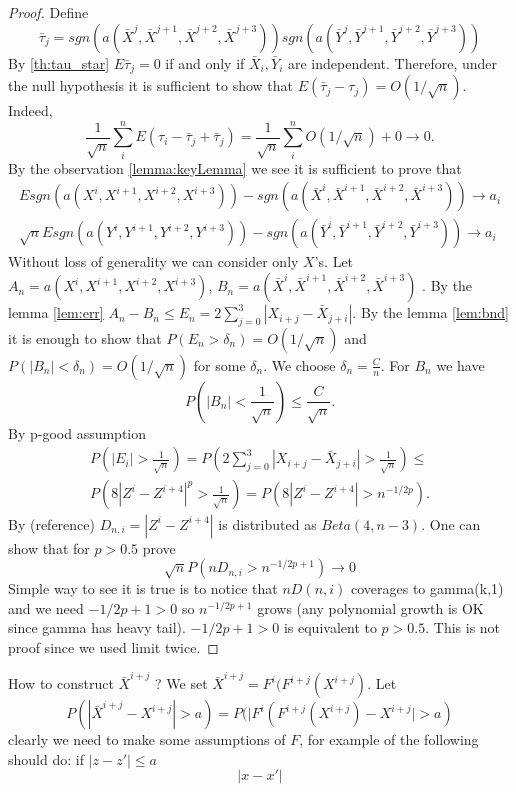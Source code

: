 \documentclass{article}
\begin{document}
\begin{proof}
Define 
\[
 \bar \tau_j = sgn(a(\bar X^{j},\bar X^{j+1},\bar X^{j+2}, \bar X^{j+3})) sgn(a(\bar Y^{j},\bar Y^{j+1},\bar Y^{j+2},\bar Y^{j+3}))
\]
By \ref{th:tau_star} $E \bar \tau_j=0$ if and only if  $\bar X_i , \bar Y_i$ are independent. Therefore, under the null hypothesis it is sufficient to show  that $ E (\bar \tau_j - \tau_j) = O(1/ \sqrt n)$. Indeed, 
\[
 \frac{1} {\sqrt n} \sum_{i}^{n} E (\tau_i - \bar \tau_j +\bar \tau_j) = \frac{1} {\sqrt n} \sum_{i}^{n} O(1/ \sqrt n) +0 \to 0.
\]
By the observation \ref{lemma:keyLemma} we see it is sufficient to prove that  
\begin{align}
   E sgn(a(X^{i},X^{i+1},X^{i+2},X^{i+3})) - sgn(a(\bar X^{i},\bar X^{i+1},\bar X^{i+2}, \bar X^{i+3})) \to a_i  \\
  \sqrt n  E sgn(a(Y^{i},Y^{i+1},Y^{i+2},Y^{i+3})) - sgn(a(\bar Y^{i},\bar Y^{i+1},\bar Y^{i+2}, \bar Y^{i+3})) \to a_i
\end{align}
Without loss of generality we can consider only $X$'s. Let $A_n = a(X^{i},X^{i+1},X^{i+2},X^{i+3})$, $B_n = a(\bar X^{i},\bar X^{i+1},\bar X^{i+2}, \bar X^{i+3})$ . By the lemma \ref{lem:err} $ A_n-B_n \leq E_n = 2 \sum_{j=0}^3 |X_{i+j}-\bar X_{j+i}|$. By the lemma  \ref{lem:bnd} it is enough to show that  $P( E_n > \delta_n ) = O(1/ \sqrt n)$ and $P( |B_n| < \delta_n )=O(1/ \sqrt n)$ for some  $\delta_n$. We choose $\delta_n = \frac{C} {n}$. For $B_n$ we have 
\[
 P( |B_n| < \frac{1}{\sqrt n} ) \leq \frac{C}{\sqrt n}. 
\]
By p-good assumption
\begin{align}
 P(|E_i| > \frac{1}{\sqrt n} ) = P( 2 \sum_{j=0}^3 |X_{i+j}-\bar X_{j+i}| > \frac{1}{\sqrt n} ) \leq \\
 P( 8|Z^i - Z^{i+4}|^p > \frac{1}{\sqrt n} )   =  P(  8|Z^i - Z^{i+4}| > n^{-1/2p} ).
\end{align}
By (reference)  $D_{n,i} = |Z^i - Z^{i+4}|$ is distributed as $Beta(4,n-3)$.  One can show that for $p>0.5$ prove
\[
 \sqrt n P( n D_{n,i} > n^{-1/2p+1}) \to 0 
\]
Simple way to see it is true is to  notice that $n D(n,i)$ coverages to gamma(k,1) and we need $-1/2p+1 >0 $ so $n^{-1/2p+1}$ grows (any polynomial growth is OK since gamma has heavy tail).  $-1/2p+1 >0$ is equivalent to $p>0.5$. This is not proof since we used limit twice.
\end{proof}

How to construct $\bar X^{i+j}$ ? We set $\bar X^{i+j} =  F^i(F^{i+j}(X^{i+j})$. Let 
\[
 P( |\bar X^{i+j} -X^{i+j}  |>a) = P( |F^i(F^{i+j}(X^{i+j}) -X^{i+j}  |>a) 
\]
clearly we need to make some assumptions  of $F$, for example of the following should do:  if $|z-z'| \leq a $
\[
 |x-x'| 
\]






% 
% 
% 
\end{document}
